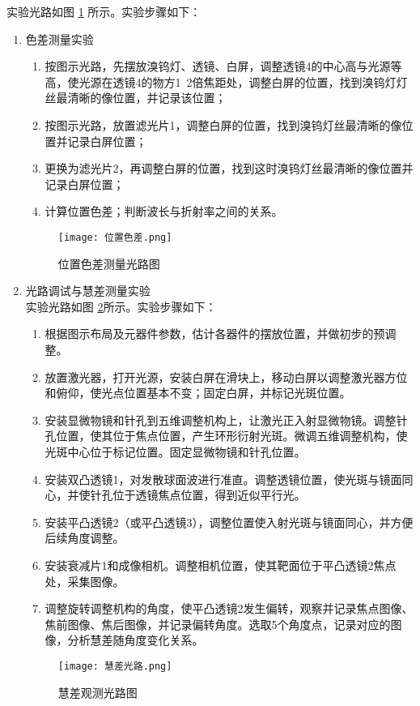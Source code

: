 \documentclass[dvipsnames, svgnames,a4paper,11pt]{article}
\begin{document}
	
	实验光路如图 \ref{位置色差} 所示。实验步骤如下：
	\begin{enumerate}
\item 色差测量实验

	\begin{enumerate}
		\item 按图示光路，先摆放溴钨灯、透镜、白屏，调整透镜4的中心高与光源等高，使光源在透镜4的物方1~2倍焦距处，调整白屏的位置，找到溴钨灯灯丝最清晰的像位置，并记录该位置；
		\item 按图示光路，放置滤光片1，调整白屏的位置，找到溴钨灯丝最清晰的像位置并记录白屏位置；
		\item 更换为滤光片2，再调整白屏的位置，找到这时溴钨灯丝最清晰的像位置并记录白屏位置；
		\item 计算位置色差；判断波长与折射率之间的关系。
	\end{enumerate}
	\begin{figure}[H]
		\centering
		\texttt{[image: 位置色差.png]}
		\caption{位置色差测量光路图}
		\label{位置色差}
	\end{figure}
	\item 光路调试与慧差测量实验\\
	实验光路如图 \ref{慧差}所示。实验步骤如下：
	\begin{enumerate}
		\item 根据图示布局及元器件参数，估计各器件的摆放位置，并做初步的预调整。
		\item 放置激光器，打开光源，安装白屏在滑块上，移动白屏以调整激光器方位和俯仰，使光点位置基本不变；固定白屏，并标记光斑位置。
		\item 安装显微物镜和针孔到五维调整机构上，让激光正入射显微物镜。调整针孔位置，使其位于焦点位置，产生环形衍射光斑。微调五维调整机构，使光斑中心位于标记位置。固定显微物镜和针孔位置。
		\item 安装双凸透镜1，对发散球面波进行准直。调整透镜位置，使光斑与镜面同心，并使针孔位于透镜焦点位置，得到近似平行光。
		\item 安装平凸透镜2（或平凸透镜3），调整位置使入射光斑与镜面同心，并方便后续角度调整。
		\item 安装衰减片1和成像相机。调整相机位置，使其靶面位于平凸透镜2焦点处，采集图像。
		\item 调整旋转调整机构的角度，使平凸透镜2发生偏转，观察并记录焦点图像、焦前图像、焦后图像，并记录偏转角度。选取5个角度点，记录对应的图像，分析慧差随角度变化关系。
		
	\end{enumerate}
	\begin{figure}[H]
		\centering
		\texttt{[image: 慧差光路.png]}
		\caption{慧差观测光路图}
		\label{慧差}
	\end{figure}
\end{enumerate}
\end{document}
